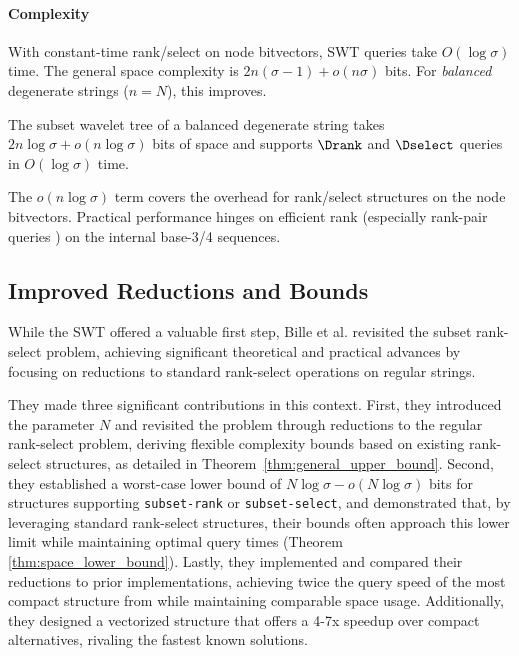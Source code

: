 \paragraph{Complexity} With constant-time rank/select on node bitvectors, SWT queries take $O(\log \sigma)$ time. The general space complexity is $2n(\sigma - 1) + o(n\sigma)$ bits. For \emph{balanced} degenerate strings ($n=N$), this improves.

\begin{theorem} \label{thm:swt_space_balanced}
    The subset wavelet tree of a balanced degenerate string takes $2n \log \sigma + o(n \log \sigma)$ bits of space and supports $\Drank$ and $\Dselect$ queries in $O(\log \sigma)$ time.
\end{theorem}
The $o(n \log \sigma)$ term covers the overhead for rank/select structures on the node bitvectors. Practical performance hinges on efficient rank (especially rank-pair queries \cite{SubsetWT}) on the internal base-3/4 sequences.


\subsection{Improved Reductions and Bounds}
\label{sec:degenerate_string_better}

While the SWT offered a valuable first step, Bille et al. \cite{bille2023rank} revisited the subset rank-select problem, achieving significant theoretical and practical advances by focusing on reductions to standard rank-select operations on regular strings.

\noindent They made three significant contributions in this context. First, they introduced the parameter $N$ and revisited the problem through reductions to the regular rank-select problem, deriving flexible complexity bounds based on existing rank-select structures, as detailed in Theorem~\ref{thm:general_upper_bound}. Second, they established a worst-case lower bound of $N\log \sigma - o(N\log \sigma)$ bits for structures supporting \texttt{subset-rank} or \texttt{subset-select}, and demonstrated that, by leveraging standard rank-select structures, their bounds often approach this lower limit while maintaining optimal query times (Theorem \ref{thm:space_lower_bound}). Lastly, they implemented and compared their reductions to prior implementations, achieving twice the query speed of the most compact structure from \cite{SubsetWT} while maintaining comparable space usage. Additionally, they designed a vectorized structure that offers a 4-7x speedup over compact alternatives, rivaling the fastest known solutions.

